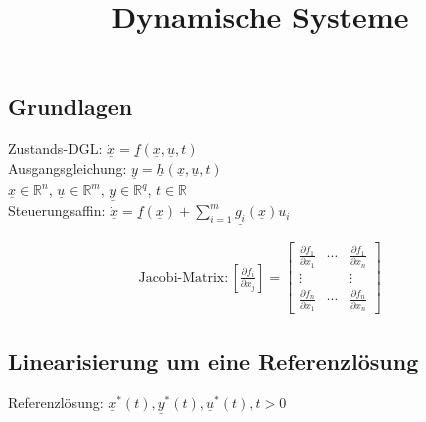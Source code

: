 \documentclass[6pt,a4paper,fleqn]{scrartcl}
\date{}
\begin{document}

\setlength{\columnseprule}{1pt}\begin{multicols*}{4}
\setlength\parindent{0pt}      

\title{Dynamische Systeme}
\maketitle


\section{Grundlagen}

Zustands-DGL: $\underline{\dot{x}} =  \underline{f}\left( \underline{x}, \underline{u}, t \right) $ \\
Ausgangsgleichung: $\underline{y} = \underline{h} \left( \underline{x}, \underline{u}, t \right)$ \\
$\underline{x} \in \mathbb{R}^n$, $\underline{u} \in \mathbb{R}^m$, $\underline{y} \in \mathbb{R}^q$, $t \in \mathbb{R}$\\

Steuerungsaffin: $\underline{\dot{x}} = \underline{f}(\underline{x}) + \sum_{i=1}^{m} \underline{g_i}(\underline{x}) u_i$

\begin{align*}
\text{Jacobi-Matrix:} \,
\left[ \frac{\partial f_i}{\partial x_j} \right] = 
\begin{bmatrix} 
  \frac{\partial f_1}{\partial x_1} &   \cdots  &   \frac{\partial f_1}{\partial x_n} \\
  \vdots                            &           &   \vdots \\
  \frac{\partial f_n}{\partial x_1} &   \cdots  &   \frac{\partial f_n}{\partial x_n}
\end{bmatrix}
\end{align*}

\subsection{Linearisierung um eine Referenzlösung}

Referenzlösung: $\underline{x}^*(t), \underline{y}^*(t), \underline{u}^*(t), t > 0$ \\


\end{multicols*}
\end{document}
